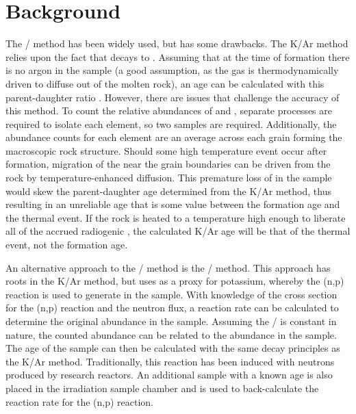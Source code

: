 \documentclass{mc2015}
\begin{document}
\section{Background}
The / method has been widely used, but has some drawbacks. The K/Ar method relies upon the fact that  decays to . Assuming that at the time of formation there is no argon in the sample (a good assumption, as the gas is thermodynamically driven to diffuse out of the molten rock), an age can be calculated with this parent-daughter ratio \cite{mcdougall_geochronology_1999}. However, there are issues that challenge the accuracy of this method. To count the relative abundances of  and , separate processes are required to isolate each element, so two samples are required. Additionally, the abundance counts for each element are an average across each grain forming the macroscopic rock structure. Should some high temperature event occur after formation, migration of the  near the grain boundaries can be driven from the rock by temperature-enhanced diffusion. This premature loss of  in the sample would skew the parent-daughter age determined from the K/Ar method, thus resulting in an unreliable age that is some value between the formation age and the thermal event. If the rock is heated to a temperature high enough to liberate all of the accrued radiogenic , the calculated K/Ar age will be that of the thermal event, not the formation age. 

An alternative approach to the / method is the / method. This approach has roots in the K/Ar method, but uses  as a proxy for potassium, whereby the (n,p) reaction is used to generate  in the sample. With knowledge of the cross section for the (n,p) reaction and the neutron flux, a reaction rate can be calculated to determine the original  abundance in the sample. Assuming the / is constant in nature, the counted  abundance can be related to the  abundance in the sample. The age of the sample can then be calculated with the same decay principles as the K/Ar method. Traditionally, this reaction has been induced with neutrons produced by research reactors. An additional sample with a known age is also placed in the irradiation sample chamber and is used to back-calculate the reaction rate for the (n,p) reaction. 
\end{document}
